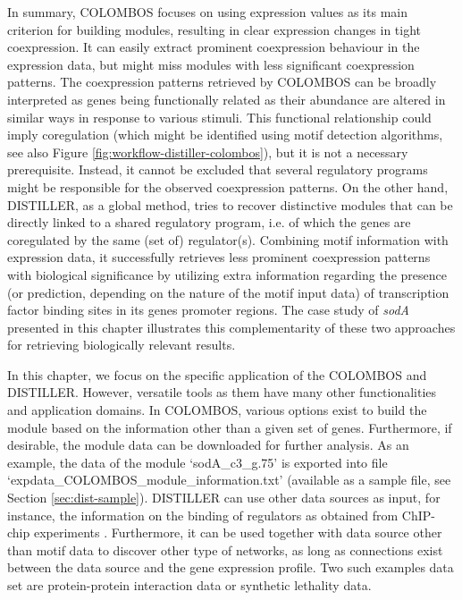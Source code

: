 In summary, COLOMBOS focuses on using expression values as its main criterion
for building modules, resulting in clear expression changes in tight
coexpression. It can easily extract prominent coexpression behaviour in the
expression data, but might miss modules with less significant coexpression
patterns. The coexpression patterns retrieved by COLOMBOS can be broadly
interpreted as genes being functionally related as their abundance are altered
in similar ways in response to various stimuli. This functional relationship
could imply coregulation (which might be identified using motif detection
algorithms, see also Figure \ref{fig:workflow-distiller-colombos}), but it is not
a necessary prerequisite.
Instead, it cannot be excluded that several regulatory programs might be 
responsible for the observed coexpression patterns.
On the other hand, DISTILLER, as a global method, tries to recover
distinctive modules that can be directly linked to a shared regulatory
program, i.e. of which the genes are coregulated by the same (set of)
regulator(s). Combining motif information with expression data, it
successfully retrieves less prominent coexpression patterns with
biological significance by utilizing extra information regarding the
presence (or prediction, depending on the nature of the motif input
data) of transcription factor binding sites in its genes promoter
regions. The case study of \textit{sodA} presented in this chapter illustrates 
this complementarity of these two approaches for retrieving biologically 
relevant results. 

In this chapter, we focus on the specific application of the COLOMBOS and
DISTILLER.  However, versatile tools as them have many other functionalities
and application domains.
%
In COLOMBOS, various options exist to build the module based on the information
other than a given set of genes.  Furthermore, if desirable, the module data
can be downloaded for further analysis.  As an example, the data of the module
`sodA\_c3\_g.75' is exported into file
`expdata\_COLOMBOS\_module\_information.txt' (available as a sample file, see
Section \ref{sec:dist-sample}).
%
DISTILLER can use other data sources as input, for instance, the information 
on the binding of regulators as obtained from ChIP-chip experiments 
\cite{Lemmens2009, Lemmens2006}.
Furthermore, it can be used together with data source other than motif data to 
discover other type of networks, as long as connections exist between the data 
source and the gene expression profile. 
Two such examples data set are protein-protein interaction data or synthetic
lethality data.



